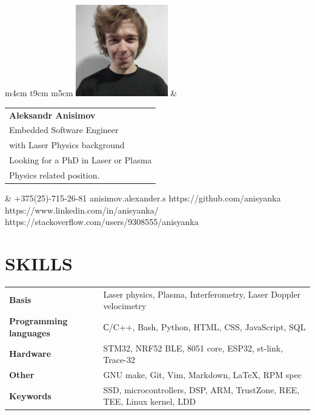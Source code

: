 \documentclass{anisyan-resume}
\begin{document}
	\begin{tabular}{ m{4cm} t{9cm} m{5cm} }
		\includegraphics[width=4cm, height=4cm]{avatar1.jpg}
		&
		\begin{tabular}{ m{9cm} }
			\textbf{\Huge Aleksandr Anisimov} \\
			\Large {Embedded Software Engineer} \\
			\Large {with Laser Physics background} \\
			\vspace{1cm}
			\large{Looking for a PhD in Laser or Plasma} \\
			\large{Physics related position.}
		\end{tabular}
		&
		 					{+375(25)-715-26-81}
		 					{anisimov.alexander.s}
		 					{https://github.com/anisyanka}
		 					{https://www.linkedin.com/in/anisyanka/}
		 					{https://stackoverflow.com/users/9308555/anisyanka}
	\end{tabular}

	\vspace{5pt}
	\section{\textbf{SKILLS}}
	\vspace{5pt}
	\def\arraystretch{1.2}
	\begin{tabular}{ >{\quad}l p{12.5cm} }
		\normalsize\textbf{Basis} & \normalsize{Laser physics, Plasma, Interferometry, Laser Doppler velocimetry} \\
		\normalsize\textbf{Programming languages} & \normalsize{С/C++, Bash, Python, HTML, CSS, JavaScript, SQL} \\
		\normalsize\textbf{Hardware} & \normalsize{STM32, NRF52 BLE, 8051 core, ESP32, st-link, Trace-32} \\
		\normalsize\textbf{Other} & \normalsize{GNU make, Git, Vim, Markdown, \LaTeX, RPM spec} \\
		\normalsize\textbf{Keywords} & \normalsize{SSD, microcontrollers, DSP, ARM, TrustZone, REE, TEE, Linux kernel, LDD} \\
	\end{tabular}
\end{document}
